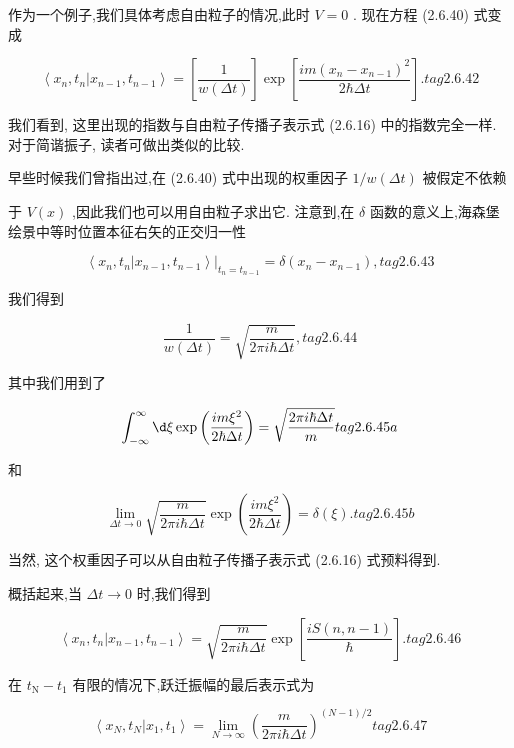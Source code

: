 \documentclass[lang=cn,newtx,10pt,scheme=chinese,thmcnt=section]{elegantbook}
\begin{document}
作为一个例子,我们具体考虑自由粒子的情况,此时 $V = 0$ . 现在方程 (2.6.40) 式变成

$$
\left\langle {{x}_{n},{t}_{n} | {x}_{n - 1},{t}_{n - 1}}\right\rangle = \left\lbrack \frac{1}{w\left( {\Delta t}\right) }\right\rbrack \exp \left\lbrack \frac{{im}{\left( {x}_{n} - {x}_{n - 1}\right) }^{2}}{2\hbar {\Delta t}}\right\rbrack . tag{2.6.42}
$$

我们看到, 这里出现的指数与自由粒子传播子表示式 (2.6.16) 中的指数完全一样. 对于简谐振子, 读者可做出类似的比较.

早些时候我们曾指出过,在 (2.6.40) 式中出现的权重因子 $1/w\left( {\Delta t}\right)$ 被假定不依赖

于 $V\left( x\right)$ ,因此我们也可以用自由粒子求出它. 注意到,在 $\delta$ 函数的意义上,海森堡绘景中等时位置本征右矢的正交归一性

$$
\left\langle {{x}_{n},{t}_{n} | {x}_{n - 1},{t}_{n - 1}}\right\rangle {\left. \right| }_{{t}_{n} = {t}_{n - 1}} = \delta \left( {{x}_{n} - {x}_{n - 1}}\right) , tag{2. 6.43}
$$

我们得到

$$
\frac{1}{w\left( {\Delta t}\right) } = \sqrt{\frac{m}{{2\pi i}\hbar {\Delta t}}}, tag{2. 6.44}
$$

其中我们用到了

$$
\int_{-\infty }^{\infty }{\d \xi }\exp \left( \frac{{im}{\xi }^{2}}{2\hbar {\Delta t}}\right) = \sqrt{\frac{{2\pi i}\hbar {\Delta t}}{m}} tag{2.6.45a}
$$

和

$$
\mathop{\lim }\limits_{{{\Delta t} \rightarrow 0}}\sqrt{\frac{m}{{2\pi i}\hbar {\Delta t}}}\exp \left( \frac{{im}{\xi }^{2}}{2\hbar {\Delta t}}\right) = \delta \left( \xi \right) . tag{2.6.45b}
$$

当然, 这个权重因子可以从自由粒子传播子表示式 (2.6.16) 式预料得到.

概括起来,当 ${\Delta t} \rightarrow 0$ 时,我们得到

$$
\left\langle {{x}_{n},{t}_{n} | {x}_{n - 1},{t}_{n - 1}}\right\rangle = \sqrt{\frac{m}{{2\pi i}\hbar {\Delta t}}}\exp \left\lbrack \frac{{iS}\left( {n, n - 1}\right) }{\hbar }\right\rbrack . tag{2.6.46}
$$

在 ${t}_{\mathrm{N}} - {t}_{1}$ 有限的情况下,跃迁振幅的最后表示式为

$$
\left\langle {{x}_{N},{t}_{N} | {x}_{1},{t}_{1}}\right\rangle = \mathop{\lim }\limits_{{N \rightarrow \infty }}{\left( \frac{m}{{2\pi i}\hbar {\Delta t}}\right) }^{\left( {N - 1}\right) /2} tag{2.6.47}
$$
\end{document}
